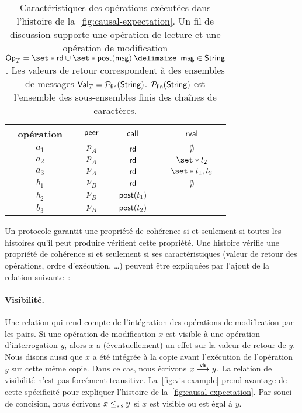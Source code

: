 \begin{table}[ht]
    \centering
    \begin{tabular}{c|c|c|c}
        opération & $\operatorname{\mathsf{peer}}$ & $\operatorname{\mathsf{call}}$ & $\operatorname{\mathsf{rval}}$ \\
        \hline
        $a_1$ & $p_A$ & $\operatorname{\mathsf{rd}}$ & $\emptyset$ \\
        $a_2$ & $p_A$ & $\operatorname{\mathsf{rd}}$ & $\set*{t_2}$ \\
        $a_3$ & $p_A$ & $\operatorname{\mathsf{rd}}$ & $\set*{t_1, t_2}$ \\
        $b_1$ & $p_B$ & $\operatorname{\mathsf{rd}}$ & $\emptyset$ \\
        $b_2$ & $p_B$ & $\operatorname{\mathsf{post}}(t_1)$ & \\
        $b_3$ & $p_B$ & $\operatorname{\mathsf{post}}(t_2)$ & \\
    \end{tabular}
    \caption{Caractéristiques des opérations exécutées dans l'histoire de la~\autoref{fig:causal-expectation}.
    Un fil de discussion supporte une opération de lecture et une opération de modification $\trm{Op}_T = \set*{\trm{rd}} \cup \set*{\trm{post}(\trm{msg}) \given \trm{msg} \in \trm{String}}$.
    Les valeurs de retour correspondent à des ensembles de messages $\operatorname{\mathsf{Val}}_T = \mathcal{P}_{\mathsf{fin}}(\operatorname{\mathsf{String}})$. $\mathcal{P}_{\mathsf{fin}}(\operatorname{\mathsf{String}})$ est l'ensemble des sous-ensembles finis des chaînes de caractères.}\label{tab:op-attributes}
\end{table}

Un protocole garantit une propriété de cohérence si et seulement si toutes les histoires qu'il peut produire vérifient cette propriété.
Une histoire vérifie une propriété de cohérence si et seulement si ses caractéristiques (valeur de retour des opérations, ordre d'exécution, \ldots) peuvent être expliquées par l'ajout de la relation suivante~:

\paragraph{Visibilité.} Une relation qui rend compte de l'intégration des opérations de modification par les pairs.
Si une opération de modification $x$ est visible à une opération d'interrogation $y$, alors $x$ a (éventuellement) un effet sur la valeur de retour de $y$.
Nous disons aussi que $x$ a été intégrée à la copie avant l'exécution de l'opération $y$ sur cette même copie.
Dans ce cas, nous écrivons $x \overset{\mathsf{vis}}{\longrightarrow} y$.
La relation de visibilité n'est pas forcément transitive.
La~\autoref{fig:vis-example} prend avantage de cette spécificité pour expliquer l'histoire de la~\autoref{fig:causal-expectation}.
Par souci de concision, nous écrivons $x \leq_{\operatorname{\mathsf{vis}}} y$ si $x$ est visible ou est égal à $y$.

